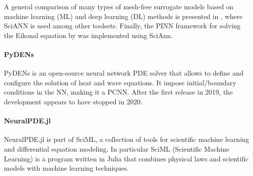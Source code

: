\documentclass[pdflatex,sn-basic]{sn-jnl}%
\theoremstyle{thmstyleone}%
\theoremstyle{thmstyletwo}%
\theoremstyle{thmstylethree}%
\begin{document}
%
A general comparison of many types of mesh-free surrogate models based on machine learning (ML) and deep learning (DL) methods is presented in \cite{Hof2021_MeshFreeSurrogate_GeiHGOK}, where SciANN is used among other toolsets.
%
%
%
Finally, the PINN framework for solving the Eikonal equation by \cite{Wah2021_PinneikEikonalSolution_HagWHA} was implemented using SciAnn.
%

\paragraph{PyDENs} %

PyDENs \citep{Kor2019_PydensPythonFramework_KhuKKT} is an open-source neural network PDE solver that allows to define and configure the solution of heat and wave equations.
It impose initial/boundary conditions in the NN, making it a PCNN.
%
After the first release in 2019, the development appears to have stopped in 2020. 




\paragraph{NeuralPDE.jl}  %

NeuralPDE.jl is part of SciML, a collection of tools for scientific machine learning and differential equation modeling.
In particular SciML (Scientific Machine Learning) \citep{Rac2021_UniversalDifferentialEquations_MaRMM}  is a program written in Julia that combines physical laws and scientific models with machine learning techniques.
\end{document}
